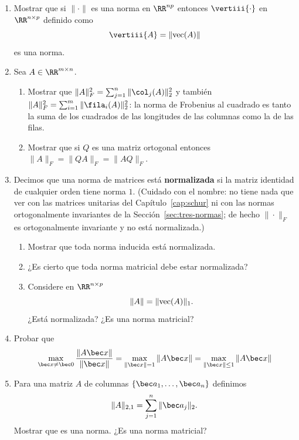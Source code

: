 \begin{enumerate}

\item\label{ejer-normaiii} Mostrar que si $\|\cdot\|$ es una norma en $\RR^{np}$ entonces $ \vertiii{\cdot}$ en $\RR^{n\times p}$ definido como
\[\vertiii{A} = \|\textup{vec}(A)\|\]
es una norma.

\item\label{ej-matrizortogonal} Sea $A\in\RR^{m\times n}$.
\begin{enumerate}[label=\textup{(\alph*)}]
    \item Mostrar que $\|A\|_F^2 = \sum_{j=1}^n \|\col_j(A)\|_2^2$ y también
    $\|A\|_F^2 = \sum_{i=1}^m \|\fila_i(A)\|_2^2$: la norma de Frobenius al
    cuadrado es tanto la suma de los cuadrados de las longitudes de las
    columnas como la de las filas.
    \item Mostrar que si $Q$ es una matriz ortogonal entonces $\|A\|_F = \|QA\|_F = \|AQ\|_F$.
\end{enumerate}

\item Decimos que una norma de matrices está \textbf{normalizada} si la matriz
identidad de cualquier orden tiene norma $1$. (Cuidado con el nombre: no tiene
nada que ver con las matrices unitarias del Capítulo~\ref{cap:schur} ni con
las normas ortogonalmente invariantes de la Sección~\ref{sec:tres-normas}; de
hecho $\|\cdot\|_F$ es ortogonalmente invariante y no está normalizada.)
\begin{enumerate}[label=\textup{(\alph*)}]
    \item Mostrar que toda norma inducida está normalizada.
    \item ¿Es cierto que toda norma matricial debe estar normalizada?
\item Considere en $\RR^{n\times p}$
\[\|A\| = \|\textup{vec}(A)\|_1.\]
¿Está normalizada? ¿Es una norma matricial?
\end{enumerate}

\item\label{ej-equivalencianormainducida} Probar que 
\[ \max_{\bec x \neq \bec 0}\frac{\|A\bec x\|}{\|\bec x\|} = \max_{\|\bec x \| = 1}{\|A\bec x\|} = \max_{\|\bec x \| \leq  1}{\|A\bec x\|}   \]

\item Para una matriz $A$ de columnas $\{\bec a_1, \dots, \bec a_n\}$ definimos
\[\|A\|_{2,1} = \sum_{j=1}^n \|\bec a_j\|_2.\]
Mostrar que es una norma. ¿Es una norma matricial?


\end{enumerate}
